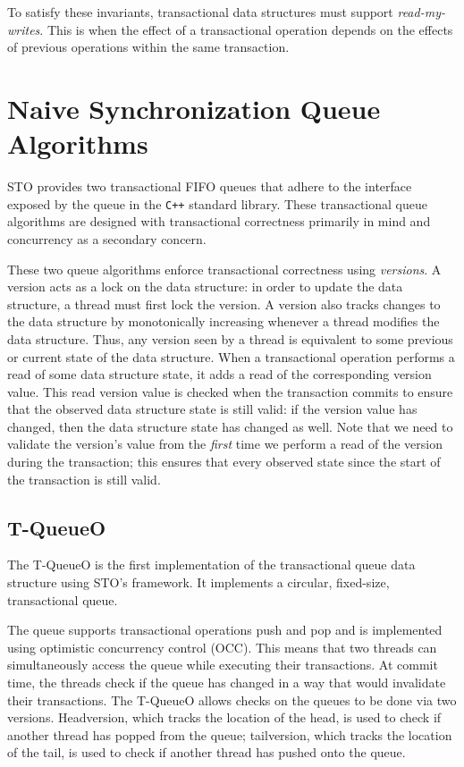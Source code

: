 \noindent
To satisfy these invariants, transactional data structures must support \emph{read-my-writes}. This is when the effect of a transactional operation depends on the effects of previous operations within the same transaction.

\section{Naive Synchronization Queue Algorithms}

STO provides two transactional FIFO queues that adhere to the interface exposed by the queue in the \texttt{C++} standard library. These transactional queue algorithms are designed with transactional correctness primarily in mind and concurrency as a secondary concern. 

These two queue algorithms enforce transactional correctness using \emph{versions}. A version acts as a lock on the data structure: in order to update the data structure, a thread must first lock the version. A version also tracks changes to the data structure by monotonically increasing whenever a thread modifies the data structure. Thus, any version seen by a thread is equivalent to some previous or current state of the data structure. When a transactional operation performs a read of some data structure state, it adds a read of the corresponding version value. This read version value is checked when the transaction commits to ensure that the observed data structure state is still valid: if the version value has changed, then the data structure state has changed as well.
Note that we need to validate the version's value from the \emph{first} time we perform a read of the version during the transaction; this ensures that every observed state since the start of the transaction is still valid.

\subsection{T-QueueO}
The T-QueueO is the first implementation of the transactional queue data structure using STO's framework. It implements a circular, fixed-size, transactional queue.

The queue supports transactional operations push and pop and is implemented using optimistic concurrency control (OCC). This means that two threads can simultaneously access the queue while executing their transactions. At commit time, the threads check if the queue has changed in a way that would invalidate their transactions. The T-QueueO allows checks on the queues to be done via two versions. Headversion, which tracks the location of the head, is used to check if another thread has popped from the queue; tailversion, which tracks the location of the tail, is used to check if another thread has pushed onto the queue.

